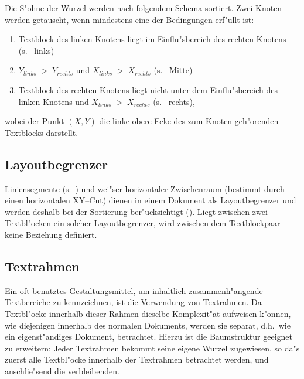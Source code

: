 
Die S"ohne der Wurzel werden nach folgendem
Schema sortiert. Zwei Knoten werden getauscht, wenn mindestens eine der Bedingungen
erf"ullt ist:
\begin{enumerate}
  \item Textblock des linken Knotens liegt im Einflu"sbereich des rechten Knotens (s.\  links)
  \item $Y_{links} \; > \; Y_{rechts}$ und $X_{links} \; > \; X_{rechts}$ (s.\  Mitte)
  \item Textblock des rechten Knotens liegt nicht unter dem Einflu"sbereich des linken Knotens
  und $X_{links} \; > \; X_{rechts}$ (s.\  rechts),
\end{enumerate}
wobei der Punkt $(X,Y)$ die linke obere Ecke des zum Knoten geh"orenden Textblocks darstellt.


\subsection*{Layoutbegrenzer}

Liniensegmente (s.\ ) und wei"ser horizontaler Zwischenraum 
(bestimmt durch einen horizontalen XY--Cut) dienen in einem Dokument als
Layoutbegrenzer und werden deshalb bei der Sortierung ber"ucksichtigt
(). Liegt zwischen zwei Textbl"ocken ein solcher
Layoutbegrenzer, wird zwischen dem Textblockpaar keine Beziehung definiert.


\subsection*{Textrahmen}

Ein oft benutztes Gestaltungsmittel, um inhaltlich zusammenh"angende Textbereiche
zu kennzeichnen, ist die Verwendung von Textrahmen. Da Textbl"ocke innerhalb
dieser Rahmen dieselbe Komplexit"at aufweisen k"onnen, wie diejenigen innerhalb 
des normalen Dokuments, werden sie separat, d.h.\ wie ein eigenst"andiges Dokument, betrachtet.
Hierzu ist die
Baumstruktur geeignet zu erweitern: Jeder Textrahmen bekommt seine eigene Wurzel
zugewiesen, so da"s zuerst alle Textbl"ocke innerhalb der Textrahmen betrachtet werden,
und anschlie"send die verbleibenden.

